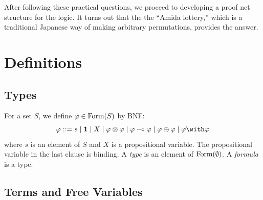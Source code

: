 After following these practical questions,
we proceed to developing a proof net structure for the logic.
It turns out that the the ``Amida lottery,'' which is a traditional
Japanese way of making arbitrary permutations, provides the answer.



\section{Definitions}

\subsection{Types}
For a set $S$, we define $\varphi\in\mathop{\text{Form}}(S)$ by BNF:
\[
 \phi::=s\mid \one \mid X \mid \phi\otimes\phi\mid \phi\limp\phi\mid
 \phi\oplus\phi\mid \phi\with\phi
\]
where $s$ is an element of $S$ and $X$ is a propositional variable.
The propositional variable in the last clause is binding.
A \textit{type} is an element of $\mathop{\text{Form}}(\emptyset)$.
A \textit{formula} is a type.

\subsection{Terms and Free Variables}

